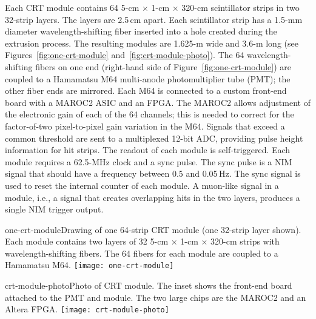 Each CRT module contains 64 5-cm $\times$ 1-cm $\times$ 320-cm scintillator strips in two 32-strip layers. The layers are 2.5\,cm apart. 
Each scintillator strip has a 1.5-mm diameter wavelength-shifting fiber inserted into a hole created during the extrusion process.  The resulting modules are 1.625-m wide and 3.6-m long (see Figures~\ref{fig:one-crt-module} and~\ref{fig:crt-module-photo}). 
The 64 wavelength-shifting fibers on one end (right-hand side of  Figure~\ref{fig:one-crt-module})
are coupled to a Hamamatsu M64 multi-anode photomultiplier tube (PMT); the other fiber ends are mirrored. 
Each M64 is connected to a custom front-end board with a MAROC2 ASIC and an FPGA. 
The MAROC2 allows adjustment of the electronic gain of each of the 64 channels; this is needed to correct for the factor-of-two pixel-to-pixel gain variation in the M64.  Signals that exceed a common threshold are sent to a multiplexed 12-bit ADC, providing pulse height information for hit strips. The readout of each module is self-triggered. Each module requires a 62.5-MHz clock and a sync pulse. The sync pulse is a NIM signal that should have 
a frequency between 0.5 and 0.05\,Hz. The sync signal is used to reset the internal counter of each module. 
A muon-like signal in a module, i.e., a signal that creates overlapping hits in the two layers, produces a single NIM trigger output.

\begin{cdrfigure}{one-crt-module}{Drawing of one 64-strip CRT module (one 32-strip layer shown).  Each module contains two layers of 32 5-cm $\times$ 1-cm $\times$ 320-cm strips with wavelength-shifting fibers.  The 64 fibers for each module are coupled to a Hamamatsu M64.}
  \texttt{[image: one-crt-module]}
\end{cdrfigure}

\begin{cdrfigure}{crt-module-photo}{Photo of CRT module. The inset shows the front-end board attached to the PMT and module. The two large chips are the MAROC2 and an Altera FPGA.}
  \texttt{[image: crt-module-photo]}
\end{cdrfigure}

